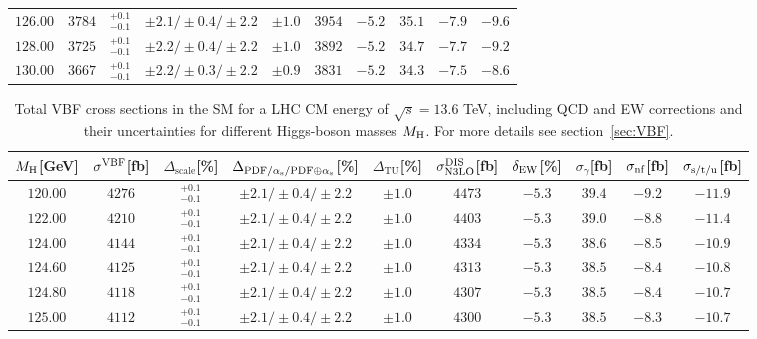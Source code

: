 \begin{table}[ht!]
\begin{center}
\begin{small}
\begin{tabular}{cccccccc|cc}
$126.00$ & $3784$ & $^{+0.1}_{-0.1}$ & $\pm 2.1/\pm 0.4/\pm 2.2$ & $\pm 1.0$ & $3954$ & $-5.2$ & $35.1 $ & $-7.9$ & $-9.6 $ \\
$128.00$ & $3725$ & $^{+0.1}_{-0.1}$ & $\pm 2.2/\pm 0.4/\pm 2.2$ & $\pm 1.0$ & $3892$ & $-5.2$ & $34.7 $ & $-7.7$ & $-9.2 $ \\
$130.00$ & $3667$ & $^{+0.1}_{-0.1}$ & $\pm 2.2/\pm 0.3/\pm 2.2$ & $\pm 0.9$ & $3831$ & $-5.2$ & $34.3 $ & $-7.5$ & $-8.6 $ \\
\bottomrule
\end{tabular}%
\end{small}%
\end{center}%
\end{table}

\begin{table}[ht!]
\caption{Total VBF cross sections in the SM for a LHC CM energy of $\sqrt{s}=13.6$ TeV, including QCD and EW corrections
and their uncertainties for different Higgs-boson masses $M_\mathrm{H}$. For more details see section~\ref{sec:VBF}.}
\label{tab:vbf_XStot_136}
\begin{center}%
\begin{small}%
\begin{tabular}{cccccccc|cc}%
\toprule
$M_\mathrm{H}$[GeV] & $\sigma^{\mathrm{VBF}}$[fb] & $\Delta_{\mathrm{scale}}$[\%] & $\Delta_{\mathrm{PDF}/\alpha_{\mathrm{s}}/\mathrm{PDF\oplus\alpha_{\mathrm{s}}}}$[\%] & $\Delta_{\mathrm{TU}}$[\%] &
$\sigma_{\mathrm{N3LO}}^{\mathrm{DIS}}$[fb] & $\delta_{\mathrm{EW}}$[\%] & $\sigma_{\gamma}$[fb] & $\sigma_{\mbox{\scriptsize nf}}$[fb] & $\sigma_{\mbox{\scriptsize s/t/u}}$[fb]
\\
\midrule
$120.00$ & $4276$ & $^{+0.1}_{-0.1}$ & $\pm 2.1/\pm 0.4/\pm 2.2$ & $\pm 1.0$ & $4473$ & $-5.3$ & $39.4$ & $-9.2$ & $-11.9$ \\
$122.00$ & $4210$ & $^{+0.1}_{-0.1}$ & $\pm 2.1/\pm 0.4/\pm 2.2$ & $\pm 1.0$ & $4403$ & $-5.3$ & $39.0$ & $-8.8$ & $-11.4$ \\
$124.00$ & $4144$ & $^{+0.1}_{-0.1}$ & $\pm 2.1/\pm 0.4/\pm 2.2$ & $\pm 1.0$ & $4334$ & $-5.3$ & $38.6$ & $-8.5$ & $-10.9$ \\
$124.60$ & $4125$ & $^{+0.1}_{-0.1}$ & $\pm 2.1/\pm 0.4/\pm 2.2$ & $\pm 1.0$ & $4313$ & $-5.3$ & $38.5$ & $-8.4$ & $-10.8$ \\
$124.80$ & $4118$ & $^{+0.1}_{-0.1}$ & $\pm 2.1/\pm 0.4/\pm 2.2$ & $\pm 1.0$ & $4307$ & $-5.3$ & $38.5$ & $-8.4$ & $-10.7$ \\
$125.00$ & $4112$ & $^{+0.1}_{-0.1}$ & $\pm 2.1/\pm 0.4/\pm 2.2$ & $\pm 1.0$ & $4300$ & $-5.3$ & $38.5$ & $-8.3$ & $-10.7$ \\

\end{tabular}
\end{small}
\end{center}
\end{table}
